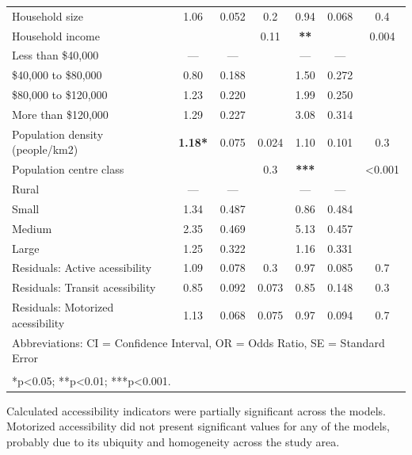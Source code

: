 \documentclass[preprint, 3p,
authoryear]{elsarticle} %
\begin{document}
\begin{table}
\begin{tabular}[t]{lcccccc}
\addlinespace
Household size & 1.06 & 0.052 & 0.2 & 0.94 & 0.068 & 0.4\\
Household income &  &  & 0.11 & \textbf{**} &  & 0.004\\
\hspace{1em}Less than \$40,000 & — & — &  & — & — & \\
\hspace{1em}\$40,000 to \$80,000 & 0.80 & 0.188 &  & 1.50 & 0.272 & \\
\hspace{1em}\$80,000 to \$120,000 & 1.23 & 0.220 &  & 1.99 & 0.250 & \\
\addlinespace
\hspace{1em}More than \$120,000 & 1.29 & 0.227 &  & 3.08 & 0.314 & \\
Population density (people/km2) & \textbf{1.18*} & 0.075 & 0.024 & 1.10 & 0.101 & 0.3\\
Population centre class &  &  & 0.3 & \textbf{***} &  & <0.001\\
\hspace{1em}Rural & — & — &  & — & — & \\
\hspace{1em}Small & 1.34 & 0.487 &  & 0.86 & 0.484 & \\
\addlinespace
\hspace{1em}Medium & 2.35 & 0.469 &  & 5.13 & 0.457 & \\
\hspace{1em}Large & 1.25 & 0.322 &  & 1.16 & 0.331 & \\
Residuals: Active acessibility & 1.09 & 0.078 & 0.3 & 0.97 & 0.085 & 0.7\\
Residuals: Transit acessibility & 0.85 & 0.092 & 0.073 & 0.85 & 0.148 & 0.3\\
Residuals: Motorized acessibility & 1.13 & 0.068 & 0.075 & 0.97 & 0.094 & 0.7\\
\bottomrule
\multicolumn{7}{l}{\rule{0pt}{1em}Abbreviations: CI = Confidence Interval, OR = Odds Ratio, SE = Standard Error}\\
\multicolumn{7}{l}{\textsuperscript{} *p<0.05; **p<0.01; ***p<0.001.}\\
\end{tabular}
\end{table}

Calculated accessibility indicators were partially significant across
the models. Motorized accessibility did not present significant values
for any of the models, probably due to its ubiquity and homogeneity
across the study area.
\end{document}
